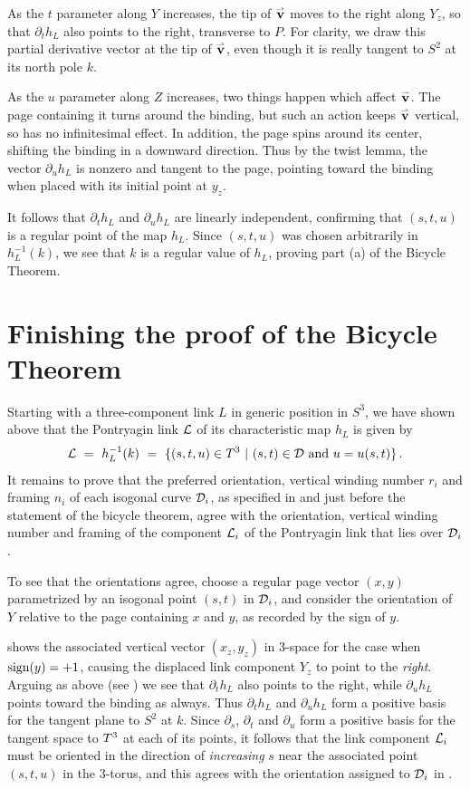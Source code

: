 As the $t$ parameter along $Y$ increases, the tip of $\vec$ moves to the right along $Y_z$, so that $\partial_t h_L$ also points to the right, transverse to $P$.  For clarity, we draw this partial derivative vector at the tip of $\vec$, even though it is really tangent to $S^2$ at its north pole $k$. 

As the $u$ parameter along $Z$ increases, two things happen which affect $\vec$.  The page containing it turns around the binding, but such an action keeps $\vec$ vertical, so has no infinitesimal effect.  In addition, the page spins around its center, shifting the binding in a downward direction.  Thus by the twist lemma, the vector $\partial_u h_L$ is nonzero  and tangent to the page, pointing toward the binding when placed with its initial point at $y_z$.     

It follows that $\partial_t h_L$ and $\partial_u h_L$ are linearly independent, confirming that $(s,t,u)$ is a regular point of the map $h_L$.  Since $(s,t,u)$ was chosen arbitrarily in $h_L^{-1}(k)$, we see that $k$ is a regular value of $h_L$, proving part (a) of the Bicycle Theorem.

\part{Finishing the proof of the Bicycle Theorem}

Starting with a three-component link $L$ in generic position in $S^3$, we have shown above 
that the Pontryagin link $\bl$ of its characteristic map $h_L$ is given by
$$
\bl \ = \ h_L^{-1}(k) \ = \ \{(s,t,u)\in\tor \st (s,t)\in\cald \text{ and } u=u(s,t)\}\,. 
$$
It remains to prove that the preferred orientation, vertical winding number $r_i$ and framing $n_i$ of each isogonal curve $\cald_i$, as specified in  and just before the statement of the bicycle theorem,  agree with the orientation, vertical winding number and framing of the component $\bl_i$ of the Pontryagin link that lies over $\cald_i$. 

To see that the orientations agree, choose a regular page vector $(x,y)$ parametrized by an isogonal point $(s,t)$ in $\cald_i$, and consider the orientation of $Y$ relative to the page containing $x$ and $y$, as recorded by the sign of $y$.  

 shows the associated vertical vector $(x_z,y_z)$ in $3$-space for the case when $\sgn(y) = +1$,  causing the displaced link component $Y_z$ to point to the {\it right}.  Arguing as above (see ) we see that  $\partial_t h_L$ also points to the right, while $\partial_u h_L$ points toward the binding as always.  Thus $\partial_t h_L$ and $\partial_u h_L$ form a positive basis for the tangent plane to $S^2$ at $k$.  Since $\partial_s$,  $\partial_t$ and $\partial_u$ form a positive basis for the tangent space to $\tor$ at each of its points, it follows that the link component $\bl_i$ must be oriented in the direction of {\it increasing} $s$ near the associated point $(s,t,u)$ in the $3$-torus, and this agrees with the orientation assigned to $\cald_i$ in .  

